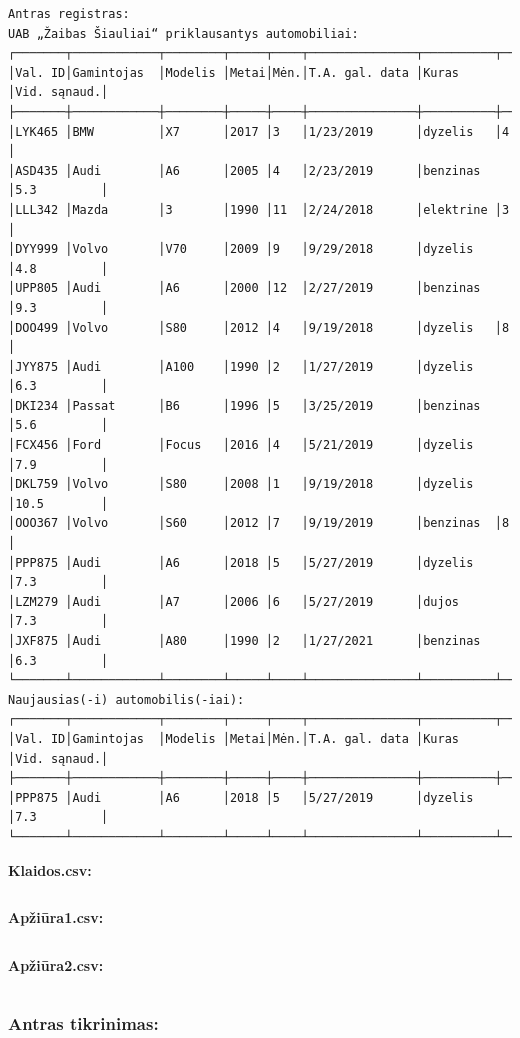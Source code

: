 \documentclass{article}
\begin{document}
\begin{verbatim}
Antras registras:
UAB „Žaibas Šiauliai“ priklausantys automobiliai:
┌───────┬────────────┬────────┬─────┬────┬───────────────┬──────────┬────────────┐
│Val. ID│Gamintojas  │Modelis │Metai│Mėn.│T.A. gal. data │Kuras     │Vid. sąnaud.│
├───────┼────────────┼────────┼─────┼────┼───────────────┼──────────┼────────────┤
│LYK465 │BMW         │X7      │2017 │3   │1/23/2019      │dyzelis   │4           │
│ASD435 │Audi        │A6      │2005 │4   │2/23/2019      │benzinas  │5.3         │
│LLL342 │Mazda       │3       │1990 │11  │2/24/2018      │elektrine │3           │
│DYY999 │Volvo       │V70     │2009 │9   │9/29/2018      │dyzelis   │4.8         │
│UPP805 │Audi        │A6      │2000 │12  │2/27/2019      │benzinas  │9.3         │
│DOO499 │Volvo       │S80     │2012 │4   │9/19/2018      │dyzelis   │8           │
│JYY875 │Audi        │A100    │1990 │2   │1/27/2019      │dyzelis   │6.3         │
│DKI234 │Passat      │B6      │1996 │5   │3/25/2019      │benzinas  │5.6         │
│FCX456 │Ford        │Focus   │2016 │4   │5/21/2019      │dyzelis   │7.9         │
│DKL759 │Volvo       │S80     │2008 │1   │9/19/2018      │dyzelis   │10.5        │
│OOO367 │Volvo       │S60     │2012 │7   │9/19/2019      │benzinas  │8           │
│PPP875 │Audi        │A6      │2018 │5   │5/27/2019      │dyzelis   │7.3         │
│LZM279 │Audi        │A7      │2006 │6   │5/27/2019      │dujos     │7.3         │
│JXF875 │Audi        │A80     │1990 │2   │1/27/2021      │benzinas  │6.3         │
└───────┴────────────┴────────┴─────┴────┴───────────────┴──────────┴────────────┘
Naujausias(-i) automobilis(-iai):
┌───────┬────────────┬────────┬─────┬────┬───────────────┬──────────┬────────────┐
│Val. ID│Gamintojas  │Modelis │Metai│Mėn.│T.A. gal. data │Kuras     │Vid. sąnaud.│
├───────┼────────────┼────────┼─────┼────┼───────────────┼──────────┼────────────┤
│PPP875 │Audi        │A6      │2018 │5   │5/27/2019      │dyzelis   │7.3         │
└───────┴────────────┴────────┴─────┴────┴───────────────┴──────────┴────────────┘
\end{verbatim}
\normalsize

\textbf{Klaidos.csv:}
\inputminted{csharp}{Assets/L3/klaidos1.csv}

\textbf{Apžiūra1.csv:}
\inputminted{csharp}{Assets/L3/apziura1-1.csv}

\textbf{Apžiūra2.csv:}
\inputminted{csharp}{Assets/L3/apziura1-2.csv}

\subsubsection{Antras tikrinimas:}
\end{document}
